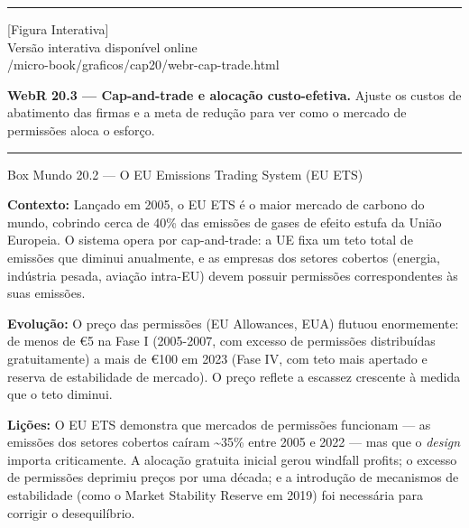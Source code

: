 \documentclass[11pt,twoside,openright]{book}
\newcommand{\figurePlaceholder}[1]{%
  \begin{center}
    \begin{tcolorbox}[
      width=0.85\textwidth,
      colback=graybg,
      colframe=gray,
      boxrule=0.5pt,
      arc=2pt,
      halign=center,
      valign=center,
      height=5cm
    ]
      \centering
      \vfill
      {\sffamily\color{gray}\large [Figura Interativa]}\\[6pt]
      {\sffamily\small\color{gray} Versão interativa disponível online}\\[4pt]
      {\ttfamily\tiny\color{gray} #1}
      \vfill
    \end{tcolorbox}
  \end{center}
}
\begin{document}
\begin{center}\rule{0.5\linewidth}{0.5pt}\end{center}

\figurePlaceholder{/micro-book/graficos/cap20/webr-cap-trade.html}

\textbf{WebR 20.3 --- Cap-and-trade e alocação custo-efetiva.} Ajuste os
custos de abatimento das firmas e a meta de redução para ver como o
mercado de permissões aloca o esforço.

\begin{center}\rule{0.5\linewidth}{0.5pt}\end{center}

\begin{boxmundobox}{Box Mundo 20.2 — O EU Emissions Trading System (EU ETS)}

\textbf{Contexto:} Lançado em 2005, o EU ETS é o maior mercado de
carbono do mundo, cobrindo cerca de 40\% das emissões de gases de efeito
estufa da União Europeia. O sistema opera por cap-and-trade: a UE fixa
um teto total de emissões que diminui anualmente, e as empresas dos
setores cobertos (energia, indústria pesada, aviação intra-EU) devem
possuir permissões correspondentes às suas emissões.

\textbf{Evolução:} O preço das permissões (EU Allowances, EUA) flutuou
enormemente: de menos de €5 na Fase I (2005-2007, com excesso de
permissões distribuídas gratuitamente) a mais de €100 em 2023 (Fase IV,
com teto mais apertado e reserva de estabilidade de mercado). O preço
reflete a escassez crescente à medida que o teto diminui.

\textbf{Lições:} O EU ETS demonstra que mercados de permissões funcionam
--- as emissões dos setores cobertos caíram \textasciitilde35\% entre
2005 e 2022 --- mas que o \emph{design} importa criticamente. A alocação
gratuita inicial gerou windfall profits; o excesso de permissões
deprimiu preços por uma década; e a introdução de mecanismos de
estabilidade (como o Market Stability Reserve em 2019) foi necessária
para corrigir o desequilíbrio.

\end{boxmundobox}
\end{document}
